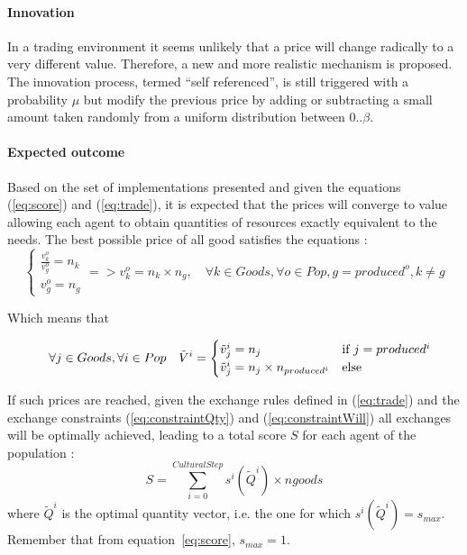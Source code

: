 \documentclass{wscpaperproc}
\begin{document}
\paragraph{Innovation} In a trading environment it seems unlikely that a price will change radically to a very different value. Therefore, a new and more realistic mechanism is proposed. The innovation process, termed ``self referenced'', is still triggered with a probability $\mu$ 
but modify the previous price by adding or subtracting a small amount taken randomly from a uniform  distribution between $0 .. \beta$.


\paragraph{Expected outcome} 

Based on the set of implementations presented and given the equations (\ref{eq:score}) and (\ref{eq:trade}), it is expected that the prices will converge to value allowing each agent to obtain quantities of resources exactly equivalent to the needs. The best possible price of all good satisfies the equations :
\begin{equation}
	\begin{cases}
		\frac{v^o_k}{v^o_g} = n_k \\
		v^o_g = n_g 
	\end{cases} =>v^o_k = n_k \times n_g, \quad \forall k \in Goods, \forall o \in Pop, g = produced^o, k \not= g 
\end{equation}

Which means that 

\begin{equation}
	\quad \forall j \in Goods, \forall i \in Pop \quad \tilde{V}^i = 
	\begin{cases}
		\tilde{v}^i_j = n_j & \text{if $ j=produced^i$}\\
		 \tilde{v}^i_j = n_j \times n_{produced^i} & \text{else}
	\end{cases}\label{eq:optimum}
\end{equation}


If such prices are reached, given the exchange rules defined in (\ref{eq:trade}) and the exchange constraints (\ref{eq:constraintQty}) and (\ref{eq:constraintWill}) all exchanges will be optimally achieved, leading to a total score $S$ for each agent of the population : 
$$ S = \sum_{i=0}^{CulturalStep}  s^i(\tilde{Q}^i) \times ngoods $$ 
where $\tilde{Q}^i$ is the optimal quantity vector, i.e. the one for which $s^i(\tilde{Q}^i) = s_{max}$. Remember that from equation~\ref{eq:score}, $s_{max}=1$.
\end{document}
